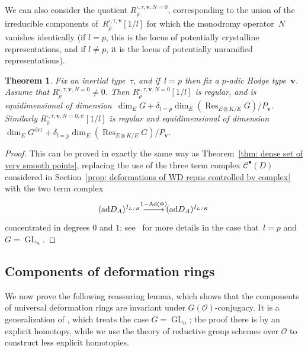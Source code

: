 \documentclass{amsart}
\renewcommand{\mathbb}{\mathbf}
\renewcommand{\ell}{l}
\def\Ad{\mathrm{Ad}}
\def\ad{\mathrm{ad}}
\newcommand\Gder{G^{\mathrm{der}}}
\newtheorem{thm}[subsubsection]{Theorem}
\newtheorem{cor}[subsubsection]{Corollary}
\theoremstyle{definition}
\theoremstyle{remark}
\newcommand{\Q}{\QQ}
\newcommand{\QQ}{{\mathbb Q}}
\newcommand{\cC}{{\mathcal C}}
\newcommand{\cO}{{\mathcal O}}
\newcommand{\Qbar}{\overline{\Q}}
\newcommand{\Qlbar}{\Qbar_{\ell}}
\DeclareMathOperator{\Gal}{Gal}
\DeclareMathOperator{\GL}{GL}
\newcommand{\rhobar}{\overline{\rho}}
\newcommand{\Res}{\operatorname{Res}}
\begin{document}


We can also consider the quotient
$R_{\rhobar}^{\square,\tau,\mathbf{v},N=0}$, corresponding to the
union of the irreducible components
of~$R_{\rhobar}^{\square,\tau,\mathbf{v}}[1/l]$ for which the
monodromy operator~$N$ vanishes identically (if $l=p$, this is the
locus of potentially crystalline representations, and if $l\ne p$, it
is the locus of potentially unramified representations).
\begin{thm}\label{thm: dimensions etc l equals p N equals 0}
  Fix an inertial type~$\tau$, and if~$l=p$ then fix a $p$-adic Hodge
  type~$\mathbf{v}$. Assume that
  $R_{\rhobar}^{\square,\tau,\mathbf{v},N=0}\ne 0$. Then $R_{\rhobar}^{\square,\tau,\mathbf{v},N=0}[1/l]$
  is regular, and is equidimensional of
  dimension~$\dim_E G+\delta_{l=p}\dim_E(\Res_{E\otimes
    K/E}G)/P_{\mathbf{v}}$. Similarly
  $R_{\rhobar}^{\square,\tau,\mathbf{v},N=0,\psi}[1/l]$ is regular and equidimensional of
  dimension~$\dim_E \Gder + \delta_{l=p}\dim_E(\Res_{E\otimes K/E}G)/P_{\mathbf{v}}$.
\end{thm}
\begin{proof}This can be proved in exactly the same way as
  Theorem~\ref{thm: dense set of very smooth points}, replacing the use of
  the three term complex $\cC^\bullet(D)$ considered in Section~\ref{prop:
    deformations of WD repns controlled by complex} with the two term complex
  \[\xymatrix{ (\ad D_A)^{I_{L/K}}\ar[r]^{1-\Ad(\Phi)} &(\ad
      D_A)^{I_{L/K}}}\]
concentrated in degrees $0$ and $1$; see~\cite[Thm.\ 3.3.8]{MR2373358} for more details in the
  case that~$l=p$ and~$G=\GL_n$.
\end{proof}

\subsection{Components of deformation rings}\label{subsec: components
  of deformation rings}We now prove %
the following
reassuring lemma, which shows that the components of universal
deformation rings are invariant under $G(\cO)$-conjugacy. 
It  is a
generalization of \cite[Lem.\ 1.2.2]{BLGGT}, which treats the case $G=\GL_n$; the proof there is by an
explicit homotopy, while we use the theory of reductive group schemes over $\cO$ to construct less explicit homotopies.
\end{document}
